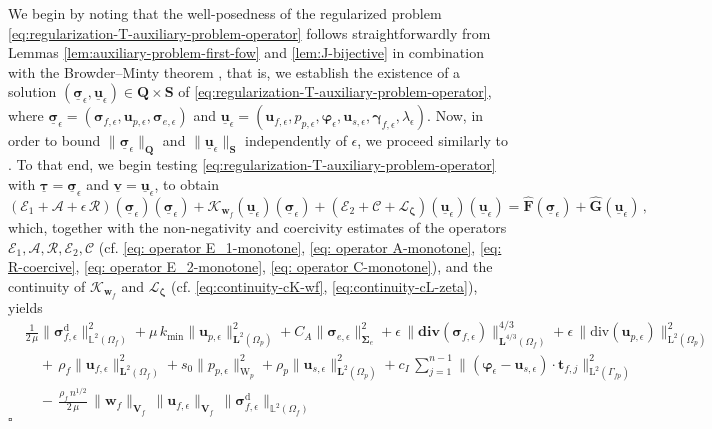 \documentclass[11pt]{article}
\numberwithin{equation}{section}
\newcommand{\bgamma}{{\boldsymbol\gamma}}
\newcommand{\bsi}{{\boldsymbol\sigma}}
\newcommand{\bSigma}{{\boldsymbol\Sigma}}
\newcommand{\bvarphi}{{\boldsymbol\varphi}}
\newcommand{\btau}{{\boldsymbol\tau}}
\newcommand{\bzeta}{{\boldsymbol\zeta}}
\newcommand{\ubsi}{\underline{\bsi}}
\newcommand{\ubtau}{\underline{\btau}}
\newcommand{\ubu}{\underline{\bu}}
\newcommand{\ubv}{\underline{\bv}}
\newcommand{\bv}{{\mathbf{v}}}
\newcommand{\bw}{{\mathbf{w}}}
\newcommand{\bu}{\mathbf{u}}
\newcommand{\bt}{{\mathbf{t}}}
\newcommand{\0}{{\mathbf{0}}}
\def\bF{\mathbf{F}}
\def\bG{\mathbf{G}}
\def\bV{\mathbf{V}}
\def\bQ{\mathbf{Q}}
\def\bS{\mathbf{S}}
\newcommand{\bL}{\mathbf{L}}
\newcommand\bbL{\mathbb{L}}
\newcommand{\cA}{\mathcal{A}}
\newcommand{\cC}{\mathcal{C}}
\newcommand{\cE}{\mathcal{E}}
\newcommand{\cK}{\mathcal{K}}
\newcommand{\cL}{\mathcal{L}}
\newcommand{\cR}{\mathcal{R}}
\def\L{\mathrm{L}}
\def\W{\mathrm{W}}
\def\rd{\mathrm{d}}
\def\bdiv{\mathbf{div}}
\def\div{\mathrm{div}}
\def\wh{\widehat}
\newenvironment{proof}{\noindent{\it Proof.}}{\hfill$\square$}
\numberwithin{equation}{section}
\begin{document}
%
\begin{proof}
We begin by noting that the well-posedness of the regularized problem \eqref{eq:regularization-T-auxiliary-problem-operator} follows straightforwardly from Lemmas \ref{lem:auxiliary-problem-first-fow} and \ref{lem:J-bijective} in combination with the Browder--Minty theorem \cite[Theorem 10.49]{Renardy-Rogers}, that is, we establish the existence of a solution $(\ubsi_\epsilon, \ubu_\epsilon)\in \bQ\times \bS$ of \eqref{eq:regularization-T-auxiliary-problem-operator}, where $\ubsi_\epsilon = (\bsi_{f,\epsilon}, \bu_{p,\epsilon}, \bsi_{e,\epsilon})$ and $\ubu_\epsilon = (\bu_{f,\epsilon}, p_{p,\epsilon}, \bvarphi_{\epsilon}, \bu_{s,\epsilon}, \bgamma_{f,\epsilon}, \lambda_{\epsilon})$.
Now, in order to bound $\|\ubsi_\epsilon\|_\bQ$ and $\|\ubu_\epsilon\|_\bS$ independently of $\epsilon$, we proceed similarly to \cite[Lemma~4.6]{aeny2019}.
To that end, we begin testing \eqref{eq:regularization-T-auxiliary-problem-operator} with $\ubtau = \ubsi_\epsilon$ and $\ubv = \ubu_\epsilon$, to obtain
\begin{equation*}%
(\cE_1 + \cA + \epsilon\,\cR)(\ubsi_\epsilon)(\ubsi_\epsilon) + \cK_{\bw_f}(\ubu_\epsilon)(\ubsi_\epsilon) + (\cE_2 + \cC +\cL_{\bzeta})(\ubu_\epsilon)(\ubu_\epsilon) = \wh{\bF}(\ubsi_\epsilon) + \wh{\bG}(\ubu_\epsilon)\,,
\end{equation*}
which, together with the non-negativity and coercivity estimates of the operators $\cE_1, \cA, \cR, \cE_2, \cC$ (cf. \eqref{eq: operator E_1-monotone}, \eqref{eq: operator A-monotone}, \eqref{eq: R-coercive}, \eqref{eq: operator E_2-monotone}, \eqref{eq: operator C-monotone}), and the continuity of $\cK_{\bw_f}$ and $\cL_{\bzeta}$ (cf. \eqref{eq:continuity-cK-wf}, \eqref{eq:continuity-cL-zeta}), yields
\begin{align}
& \frac{1}{2\,\mu} \|\bsi^\rd_{f,\epsilon}\|^2_{\bbL^2(\Omega_f)} 
+ \mu\,k_{\min} \|\bu_{p,\epsilon}\|^2_{\bL^2(\Omega_p)} 
+ C_A \|\bsi_{e,\epsilon}\|^2_{\bSigma_e} 
+ \epsilon\,\|\bdiv(\bsi_{f,\epsilon})\|^{4/3}_{\bL^{4/3}(\Omega_f)}  
+ \epsilon\,\|\div(\bu_{p,\epsilon})\|^2_{\L^2(\Omega_p)}
\nonumber \\
&\quad +\, \rho_f\|\bu_{f,\epsilon}\|^2_{\bL^2(\Omega_f)} + s_0 \|p_{p,\epsilon}\|^2_{\W_p}
+ \rho_p\|\bu_{s,\epsilon}\|^2_{\bL^2(\Omega_p)} 
+ c_I\,\sum^{n-1}_{j=1} \|( \bvarphi_{\epsilon}-\bu_{s,\epsilon})\cdot\bt_{f,j}\|^2_{\L^2(\Gamma_{fp})} \nonumber \\
&\quad -\, \frac{\rho_f\,n^{1/2}}{2\,\mu}\,\|\bw_f\|_{\bV_f}\,\|\bu_{f,\epsilon}\|_{\bV_f}\,\|\bsi^\rd_{f,\epsilon}\|_{\bbL^2(\Omega_f)}

\end{align}
\end{proof}
\end{document}
